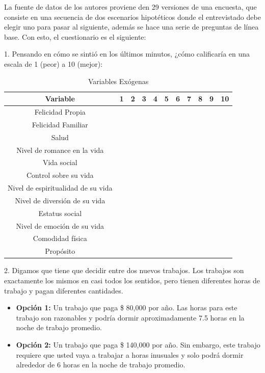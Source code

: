 \documentclass[12pt,spanish]{article}
\begin{document}
La fuente de datos de los autores proviene den 29 versiones de una encuesta, que consiste en una secuencia de dos escenarios hipotéticos donde el entrevistado debe elegir uno para pasar al siguiente, además se hace una serie de preguntas de línea base. Con esto, el cuestionario es el siguiente: 

1. Pensando en cómo se sintió en los últimos minutos, ¿cómo calificaría en una escala de 1 (peor) a 10 (mejor):
\begin{table}[H]
\centering
\caption{Variables Exógenas}
\begin{tabular}{|c|c|c|c|c|c|c|c|c|c|c|}
\hline
Variable                           & 1 & 2 & 3 & 4 & 5 & 6 & 7 & 8 & 9 & 10 \\ \hline
Felicidad Propia                   &   &   &   &   &   &   &   &   &   &    \\ \hline
Felicidad Familiar                 &   &   &   &   &   &   &   &   &   &    \\ \hline
Salud                              &   &   &   &   &   &   &   &   &   &    \\ \hline
Nivel de romance en la vida        &   &   &   &   &   &   &   &   &   &    \\ \hline
Vida social                        &   &   &   &   &   &   &   &   &   &    \\ \hline
Control sobre su vida              &   &   &   &   &   &   &   &   &   &    \\ \hline
Nivel de espiritualidad de su vida &   &   &   &   &   &   &   &   &   &    \\ \hline
Nivel de diversión de su vida      &   &   &   &   &   &   &   &   &   &    \\ \hline
Estatus social                     &   &   &   &   &   &   &   &   &   &    \\ \hline
Nivel de emoción de su vida        &   &   &   &   &   &   &   &   &   &    \\ \hline
Comodidad física                   &   &   &   &   &   &   &   &   &   &    \\ \hline
Propósito                          &   &   &   &   &   &   &   &   &   &    \\ \hline
\end{tabular}
\end{table}

2. Digamos que tiene que decidir entre dos nuevos trabajos. Los trabajos son exactamente los mismos en casi todos los sentidos, pero tienen diferentes horas de trabajo y pagan diferentes cantidades. 
\begin{itemize}
    \item \textbf{Opción 1:} Un trabajo que paga \$ 80,000 por año. Las horas para este trabajo son razonables y podría dormir aproximadamente 7.5 horas en la noche de trabajo promedio.
    \item \textbf{Opción 2:} Un trabajo que paga \$ 140,000 por año. Sin embargo, este trabajo requiere que usted vaya a trabajar a horas inusuales y solo podrá dormir alrededor de 6 horas en la noche de trabajo promedio.
\end{itemize}
\end{document}
